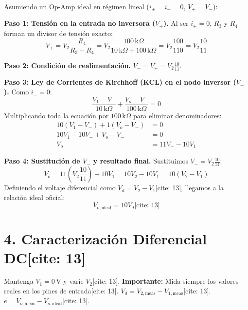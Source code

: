 \documentclass[11pt, a4paper]{article}
\begin{document}
Asumiendo un Op-Amp ideal en régimen lineal ($i_+ = i_- = 0$, $V_+ = V_-$):

\textbf{Paso 1: Tensión en la entrada no inversora ($V_+$).} Al ser $i_+ = 0$, $R_3$ y $R_4$ forman un divisor de tensión exacto:
\begin{equation*}
    V_+ = V_2 \frac{R_4}{R_3 + R_4} = V_2 \frac{100\,\text{k}\Omega}{10\,\text{k}\Omega + 100\,\text{k}\Omega} = V_2 \frac{100}{110} = V_2 \frac{10}{11}
\end{equation*}

\textbf{Paso 2: Condición de realimentación.} $V_- = V_+ = V_2 \frac{10}{11}$.

\textbf{Paso 3: Ley de Corrientes de Kirchhoff (KCL) en el nodo inversor ($V_-$).} Como $i_- = 0$:
\begin{equation*}
    \frac{V_1 - V_-}{10\,\text{k}\Omega} + \frac{V_o - V_-}{100\,\text{k}\Omega} = 0
\end{equation*}
Multiplicando toda la ecuación por $100\,\text{k}\Omega$ para eliminar denominadores:
\begin{align*}
    10(V_1 - V_-) + 1(V_o - V_-) &= 0 \\
    10V_1 - 10V_- + V_o - V_- &= 0 \\
    V_o &= 11V_- - 10V_1
\end{align*}

\textbf{Paso 4: Sustitución de $V_-$ y resultado final.} Sustituimos $V_- = V_2 \frac{10}{11}$:
\begin{equation*}
    V_o = 11\left(V_2 \frac{10}{11}\right) - 10V_1 = 10V_2 - 10V_1 = 10(V_2 - V_1)
\end{equation*}
Definiendo el voltaje diferencial como $V_d = V_2 - V_1$[cite: 13], llegamos a la relación ideal oficial:
\begin{equation*}
    \boxed{V_{o,\mathrm{ideal}} = 10V_d} \text{[cite: 13]}
\end{equation*}

\section*{4. Caracterización Diferencial DC[cite: 13]}
Mantenga $V_1 = 0\,\text{V}$ y varíe $V_2$[cite: 13]. \textbf{Importante:} Mida siempre los valores reales en los pines de entrada[cite: 13]. $V_d = V_{2,\mathrm{meas}} - V_{1,\mathrm{meas}}$[cite: 13]. $e = V_{o,\mathrm{meas}} - V_{o,\mathrm{ideal}}$[cite: 13].
\end{document}
